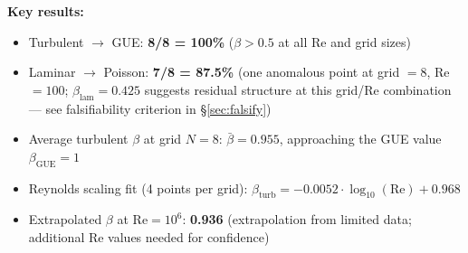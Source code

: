\documentclass[11pt,a4paper]{article}
\begin{document}
\noindent\textbf{Key results:}
\begin{itemize}[nosep]
\item Turbulent $\to$ GUE: \textbf{8/8 = 100\%} ($\beta > 0.5$ at all Re and grid sizes)
\item Laminar $\to$ Poisson: \textbf{7/8 = 87.5\%} (one anomalous point at grid $= 8$, Re $= 100$; $\beta_{\mathrm{lam}} = 0.425$ suggests residual structure at this grid/Re combination --- see falsifiability criterion in \S\ref{sec:falsify})
\item Average turbulent $\beta$ at grid $N = 8$: $\bar{\beta} = 0.955$, approaching the GUE value $\beta_{\mathrm{GUE}} = 1$
\item Reynolds scaling fit (4 points per grid): $\beta_{\mathrm{turb}} = -0.0052 \cdot \log_{10}(\mathrm{Re}) + 0.968$
\item Extrapolated $\beta$ at $\mathrm{Re} = 10^6$: \textbf{0.936} (extrapolation from limited data; additional Re values needed for confidence)
\end{itemize}
\end{document}
